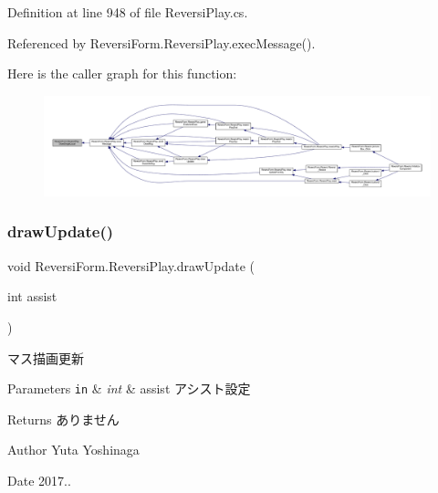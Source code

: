 Definition at line 948 of file Reversi\+Play.\+cs.



Referenced by Reversi\+Form.\+Reversi\+Play.\+exec\+Message().

Here is the caller graph for this function\+:
\nopagebreak
\begin{figure}[H]
\begin{center}
\leavevmode
\includegraphics[width=350pt]{class_reversi_form_1_1_reversi_play_aa5bd95af33165d887efeed260b23ccb2_icgraph}
\end{center}
\end{figure}
\mbox{\label{class_reversi_form_1_1_reversi_play_af1415f15759ba8475b4b5afca3a35017}} 
\subsubsection{\texorpdfstring{draw\+Update()}{drawUpdate()}}
{\footnotesize\ttfamily void Reversi\+Form.\+Reversi\+Play.\+draw\+Update (\begin{DoxyParamCaption}\item[{int}]{assist }\end{DoxyParamCaption})}



マス描画更新 


\begin{DoxyParams}[1]{Parameters}
\mbox{\tt in}  & {\em int} & assist アシスト設定 \\
\hline
\end{DoxyParams}
\begin{DoxyReturn}{Returns}
ありません 
\end{DoxyReturn}
\begin{DoxyAuthor}{Author}
Yuta Yoshinaga 
\end{DoxyAuthor}
\begin{DoxyDate}{Date}
2017.. 
\end{DoxyDate}


